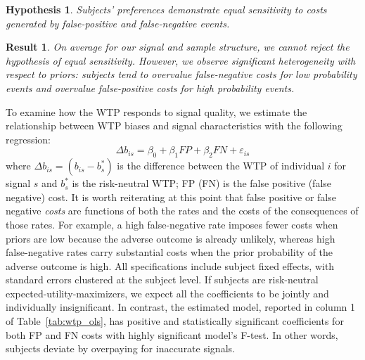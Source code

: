 \documentclass[12pt,a4paper]{article}
\newtheorem{hypothesis}{Hypothesis}
\newtheorem{result}{Result}
\begin{document}





\begin{hypothesis}\label{hyp:eqSen} 
Subjects' preferences demonstrate equal sensitivity to costs generated by false-positive and false-negative events. 
\end{hypothesis}

\begin{result} 
On average for our signal and sample structure, we cannot reject the hypothesis of equal sensitivity. However, we observe significant heterogeneity with respect to priors: subjects tend to overvalue false-negative costs for low probability events and overvalue false-positive costs for high probability events. 
\end{result}


To examine how the WTP responds to signal quality, we estimate the relationship between WTP biases and signal characteristics with the following regression:
\[\Delta b_{is} = \beta_0 + \beta_1 FP + \beta_2 FN + \varepsilon_{is}\]
where $\Delta b_{is} = (b_{is} - b^*_s)$ is the difference between the WTP of individual $i$ for signal $s$ and $b^*_s$ is the risk-neutral WTP; FP (FN) is the false positive (false negative) cost.  It is worth reiterating at this point that false positive or false negative \textit{costs} are functions of both the rates and the costs of the consequences of those rates.  For example, a high false-negative rate imposes fewer costs when priors are low because the adverse outcome is already unlikely, whereas high false-negative rates carry substantial costs when the prior probability of the adverse outcome is high. All specifications include subject fixed effects, with standard errors clustered at the subject level. If subjects are risk-neutral expected-utility-maximizers, we expect all the coefficients to be jointly and individually insignificant. In contrast, the estimated model, reported in column 1 of Table~\ref{tab:wtp_ols}, has positive and statistically significant coefficients for both FP and FN costs with highly significant model's F-test. In other words, subjects deviate by overpaying for inaccurate signals. 


\end{document}
